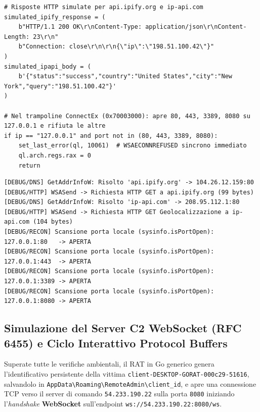\documentclass[11pt, a4paper]{article}
\begin{document}
\begin{lstlisting}[style=pythoncode, caption={Simulazione HTTP per IP pubblico/geolocalizzazione e filtro porte nel trampoline ConnectEx.}, label={lst:gorat_net}]
# Risposte HTTP simulate per api.ipify.org e ip-api.com
simulated_ipify_response = (
    b"HTTP/1.1 200 OK\r\nContent-Type: application/json\r\nContent-Length: 23\r\n"
    b"Connection: close\r\n\r\n{\"ip\":\"198.51.100.42\"}"
)
simulated_ipapi_body = (
    b'{"status":"success","country":"United States","city":"New York","query":"198.51.100.42"}'
)

# Nel trampoline ConnectEx (0x70003000): apre 80, 443, 3389, 8080 su 127.0.0.1 e rifiuta le altre
if ip == "127.0.0.1" and port not in (80, 443, 3389, 8080):
    set_last_error(ql, 10061)  # WSAECONNREFUSED sincrono immediato
    ql.arch.regs.rax = 0
    return
\end{lstlisting}


\noindent\begin{minipage}{\linewidth}
\begin{lstlisting}[style=consoleout, caption={Risoluzione DNS simulata, risposte di geolocalizzazione e scansione delle porte locali.}, label={lst:gorat_net_out}]
[DEBUG/DNS] GetAddrInfoW: Risolto 'api.ipify.org' -> 104.26.12.159:80
[DEBUG/HTTP] WSASend -> Richiesta HTTP GET a api.ipify.org (99 bytes)
[DEBUG/DNS] GetAddrInfoW: Risolto 'ip-api.com' -> 208.95.112.1:80
[DEBUG/HTTP] WSASend -> Richiesta HTTP GET Geolocalizzazione a ip-api.com (104 bytes)
[DEBUG/RECON] Scansione porta locale (sysinfo.isPortOpen): 127.0.0.1:80   -> APERTA
[DEBUG/RECON] Scansione porta locale (sysinfo.isPortOpen): 127.0.0.1:443  -> APERTA
[DEBUG/RECON] Scansione porta locale (sysinfo.isPortOpen): 127.0.0.1:3389 -> APERTA
[DEBUG/RECON] Scansione porta locale (sysinfo.isPortOpen): 127.0.0.1:8080 -> APERTA
\end{lstlisting}
\end{minipage}


\subsection{Simulazione del Server C2 WebSocket (RFC 6455) e Ciclo Interattivo Protocol Buffers}

Superate tutte le verifiche ambientali, il RAT in Go generico genera l'identificativo persistente della vittima \texttt{client-\allowbreak{}DESKTOP-\allowbreak{}GORAT-\allowbreak{}000c29-\allowbreak{}51616}, salvandolo in \texttt{App\allowbreak{}Data\textbackslash\allowbreak{}Roaming\textbackslash\allowbreak{}Remote\allowbreak{}Admin\textbackslash\allowbreak{}client\_\allowbreak{}id}, e apre una connessione TCP verso il server di comando \texttt{54.233.190.22} sulla porta \texttt{8080} iniziando l'\textit{handshake} \textbf{WebSocket} sull'endpoint \texttt{ws://\allowbreak{}54.233.190.22:8080/\allowbreak{}ws}.
\end{document}
